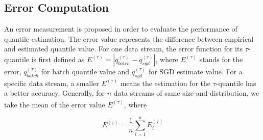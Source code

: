 \subsection{Error Computation}

An error measurement is proposed in order to evaluate the performance of quantile estimation. The error value represents the difference between empirical and estimated quantile value. For one data stream, the error function for its $\tau$-quantile is first defined as $E^{(\tau)} = | q_{batch}^{(\tau)} - q_{sgd}^{(\tau)} |$, where $E^{(\tau)}$ stands for the error, $q_{batch}^{(\tau)}$ for batch quantile value and $q_{sgd}^{(\tau)}$ for SGD estimate value. For a specific data stream, a smaller $E^{(\tau)}$ means the estimation for the $\tau$-quantile has a better accuracy. Generally, for $n$ data streams of same size and distribution, we take the mean of the error value $\overline{E^{(\tau)}}$, where 

    \begin{equation}
        \overline{E^{(\tau)}} = \frac{1}{n}\sum_{i=1}^{n} E^{(\tau)}_{i}
    \end{equation}
        
